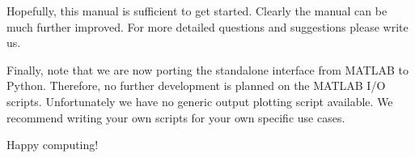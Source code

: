 \documentclass{article}
\begin{document}
Hopefully, this manual is sufficient to get started. Clearly the manual can be much further improved. For more detailed questions and suggestions please write us.

Finally, note that we are now porting the standalone interface from MATLAB to Python. Therefore, no further development is planned on the MATLAB I/O scripts. Unfortunately we have no generic output plotting script available. We recommend writing your own scripts for your own specific use cases.

Happy computing!

\end{document}
